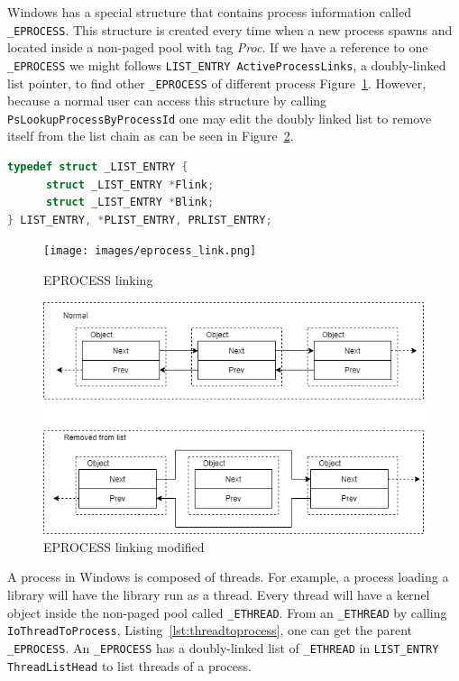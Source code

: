 Windows has a special structure that contains process information called \texttt{\_EPROCESS}. This structure is created every time when a new process spawns and located inside a non-paged pool with tag \textit{Proc}. If we have a reference to one \texttt{\_EPROCESS} we might follows \texttt{LIST\_ENTRY ActiveProcessLinks}, a doubly-linked list pointer, to find other \texttt{\_EPROCESS} of different process Figure~\ref{fig:eprocesslink}. However, because a normal user can access this structure by calling \texttt{PsLookupProcessByProcessId} one may edit the doubly linked list to remove itself from the list chain as can be seen in Figure~\ref{fig:dkom}.


\begin{lstlisting}[language=cpp,caption={LIST\_ENTRY},label={lst:listentry}]
typedef struct _LIST_ENTRY {
      struct _LIST_ENTRY *Flink;
      struct _LIST_ENTRY *Blink;
} LIST_ENTRY, *PLIST_ENTRY, PRLIST_ENTRY;
\end{lstlisting}

\begin{figure}[H]
\centering
\texttt{[image: images/eprocess\_link.png]}
\caption{EPROCESS linking}
\label{fig:eprocesslink}
\end{figure}

\begin{figure}[H]
\centering
\includegraphics[scale=0.6]{images/dkom.png}
\caption{EPROCESS linking modified}
\label{fig:dkom}
\end{figure}

A process in Windows is composed of threads. For example, a process loading a library will have the library run as a thread. Every thread will have a kernel object inside the non-paged pool called \texttt{\_ETHREAD}. From an \texttt{\_ETHREAD} by calling \texttt{IoThreadToProcess}, Listing~\ref{lst:threadtoprocess}, one can get the parent \texttt{\_EPROCESS}. An \texttt{\_EPROCESS} has a doubly-linked list of \texttt{\_ETHREAD} in \texttt{LIST\_ENTRY ThreadListHead} to list threads of a process.

